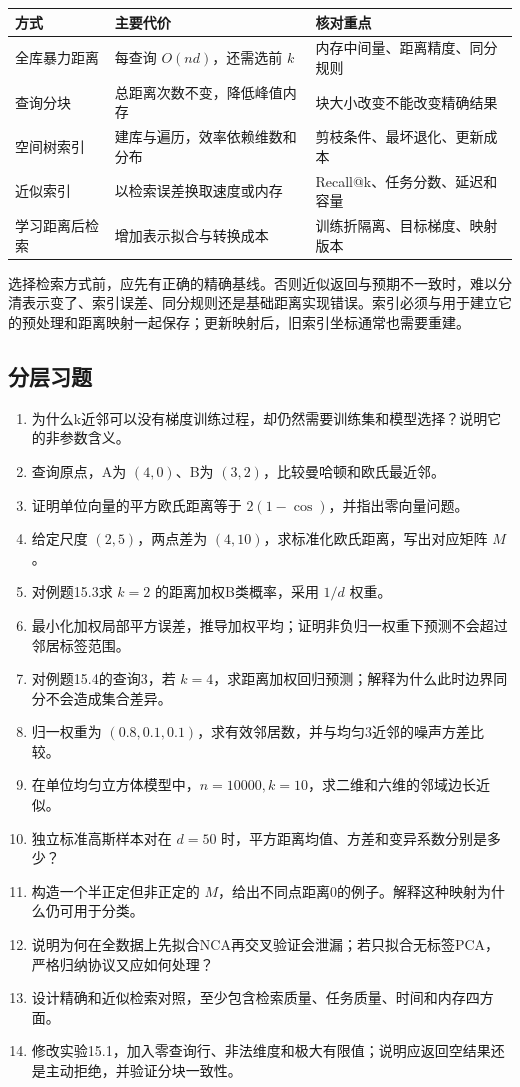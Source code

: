 \documentclass[UTF8,fontset=none,zihao=-4,a4paper]{ctexart}
\numberwithin{equation}{section}
\numberwithin{figure}{section}
\begin{document}
\begin{center}
\begin{tabularx}{\linewidth}{lYY}
\toprule
方式 & 主要代价 & 核对重点\\\midrule
全库暴力距离 & 每查询 $O(nd)$，还需选前 $k$ & 内存中间量、距离精度、同分规则\\
查询分块 & 总距离次数不变，降低峰值内存 & 块大小改变不能改变精确结果\\
空间树索引 & 建库与遍历，效率依赖维数和分布 & 剪枝条件、最坏退化、更新成本\\
近似索引 & 以检索误差换取速度或内存 & Recall@k、任务分数、延迟和容量\\
学习距离后检索 & 增加表示拟合与转换成本 & 训练折隔离、目标梯度、映射版本\\\bottomrule
\end{tabularx}
\end{center}
选择检索方式前，应先有正确的精确基线。否则近似返回与预期不一致时，难以分清表示变了、索引误差、同分规则还是基础距离实现错误。索引必须与用于建立它的预处理和距离映射一起保存；更新映射后，旧索引坐标通常也需要重建。

\clearpage
\subsection{分层习题}
\begin{enumerate}[label=15.\arabic*.,before={\interlinepenalty=10000}]
\item 为什么k近邻可以没有梯度训练过程，却仍然需要训练集和模型选择？说明它的非参数含义。
\item 查询原点，A为 $(4,0)$、B为 $(3,2)$，比较曼哈顿和欧氏最近邻。
\item 证明单位向量的平方欧氏距离等于 $2(1-\cos)$，并指出零向量问题。
\item 给定尺度 $(2,5)$，两点差为 $(4,10)$，求标准化欧氏距离，写出对应矩阵 $M$。
\item 对例题15.3求 $k=2$ 的距离加权B类概率，采用 $1/d$ 权重。
\item 最小化加权局部平方误差，推导加权平均；证明非负归一权重下预测不会超过邻居标签范围。
\item 对例题15.4的查询3，若 $k=4$，求距离加权回归预测；解释为什么此时边界同分不会造成集合差异。
\item 归一权重为 $(0.8,0.1,0.1)$，求有效邻居数，并与均匀3近邻的噪声方差比较。
\item 在单位均匀立方体模型中，$n=10000,k=10$，求二维和六维的邻域边长近似。
\item 独立标准高斯样本对在 $d=50$ 时，平方距离均值、方差和变异系数分别是多少？
\item 构造一个半正定但非正定的 $M$，给出不同点距离0的例子。解释这种映射为什么仍可用于分类。
\item 说明为何在全数据上先拟合NCA再交叉验证会泄漏；若只拟合无标签PCA，严格归纳协议又应如何处理？
\item 设计精确和近似检索对照，至少包含检索质量、任务质量、时间和内存四方面。
\item 修改实验15.1，加入零查询行、非法维度和极大有限值；说明应返回空结果还是主动拒绝，并验证分块一致性。
\end{enumerate}
\end{document}
